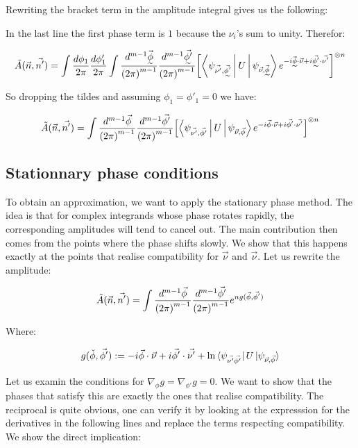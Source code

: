 \documentclass{article}
\begin{document}
Rewriting the bracket term in the amplitude integral gives us the following:



In the last line the first phase term is $1$ because the $\nu_{i}$'s sum to unity. Therefor:

\[ \Ampl{\vec{n}}{\vec{n'}} =  \int \frac{d \phi_{1}}{2\pi} \frac{d \phi'_{1}}{2\pi} \int \frac{d^{m-1}\vec{\undertilde{\phi}}}{{(2\pi)}^{m-1}} \frac{d^{m-1}\vec{\undertilde{\phi'}}}{{(2\pi)}^{m-1}} {\left[ \Braket{\psiVec{\nu'}{\undertilde{\phi'}} | U | \psiVec{\nu}{\undertilde{\phi}}} e^{-i \vec{\undertilde{\phi}} \cdot \vec{\nu} + i \vec{\undertilde{\phi'}} \cdot \vec{\nu'}} \right] }^{\otimes n}  \]

So dropping the tildes and assuming $\phi_{1} = \phi'_{1} = 0$ we have:

\[ \tilde{A}(\vec{n},\vec{n'}) =  \int \frac{d^{m-1}\vec{\phi}}{{(2\pi)}^{m-1}} \frac{d^{m-1}\vec{\phi'}}{{(2\pi)}^{m-1}} {\left[ \Braket{\psi_{\vec{\nu'},\vec{\phi'}} | U | \psi_{\vec{\nu},\vec{\phi}}} e^{-i \vec{\phi} \cdot \vec{\nu} + i \vec{\phi'} \cdot \vec{\nu'}} \right] }^{\otimes n}  \]

\subsection{Stationnary phase conditions}

To obtain an approximation, we want to apply the stationary phase method. The idea is that for complex integrands whose phase rotates rapidly, the corresponding amplitudes will tend to cancel out. The main contribution then comes from the points where the phase shifts slowly. We show that this happens exactly at the points that realise compatibility for $\vec{\nu}$ and $\vec{\nu}$. Let us rewrite the amplitude:

\[ \tilde{A}(\vec{n},\vec{n'}) =  \int \frac{d^{m-1}\vec{\phi}}{{(2\pi)}^{m-1}} \frac{d^{m-1}\vec{\phi'}}{{(2\pi)}^{m-1}} e^{n g(\vec{\phi}, \vec{\phi'})}  \]

Where:

\[g(\check{\phi}, \vec{\phi'}) := -i \vec{\phi} \cdot \vec{\nu} + i \vec{\phi'} \cdot \vec{\nu'} + \ln  \bra{\psi_{\vec{\nu'}\vec{\phi'}}} U \ket{\psi_{\vec{\nu},\vec{\phi}}} \]

Let us examin the conditions for $\nabla_{\phi} g = \nabla_{\phi'} g = 0$. We want to show that the phases that satisfy this are exactly the ones that realise compatibility. The reciprocal is quite obvious, one can verify it by looking at the expresssion for the derivatives in the following lines and replace the terms respecting compatibility. We show the direct implication:
\end{document}
